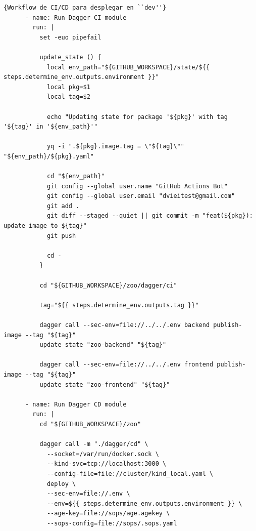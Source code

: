 \begin{itemize}
\begin{lstlisting}[language=workflows,label=lst:workflowcicd]{Workflow de CI/CD para desplegar en ``dev''}
      - name: Run Dagger CI module
        run: |
          set -euo pipefail

          update_state () {
            local env_path="${GITHUB_WORKSPACE}/state/${{ steps.determine_env.outputs.environment }}"
            local pkg=$1
            local tag=$2
            
            echo "Updating state for package '${pkg}' with tag '${tag}' in '${env_path}'"
            
            yq -i ".${pkg}.image.tag = \"${tag}\"" "${env_path}/${pkg}.yaml"

            cd "${env_path}"
            git config --global user.name "GitHub Actions Bot"
            git config --global user.email "dvieitest@gmail.com"
            git add .
            git diff --staged --quiet || git commit -m "feat(${pkg}): update image to ${tag}"
            git push

            cd -
          }

          cd "${GITHUB_WORKSPACE}/zoo/dagger/ci"

          tag="${{ steps.determine_env.outputs.tag }}"

          dagger call --sec-env=file://../../.env backend publish-image --tag "${tag}"
          update_state "zoo-backend" "${tag}"

          dagger call --sec-env=file://../../.env frontend publish-image --tag "${tag}"
          update_state "zoo-frontend" "${tag}"

      - name: Run Dagger CD module
        run: |
          cd "${GITHUB_WORKSPACE}/zoo"

          dagger call -m "./dagger/cd" \
            --socket=/var/run/docker.sock \
            --kind-svc=tcp://localhost:3000 \
            --config-file=file://cluster/kind_local.yaml \
            deploy \
            --sec-env=file://.env \
            --env=${{ steps.determine_env.outputs.environment }} \
            --age-key=file://sops/age.agekey \
            --sops-config=file://sops/.sops.yaml
    \end{lstlisting}

\end{itemize}




